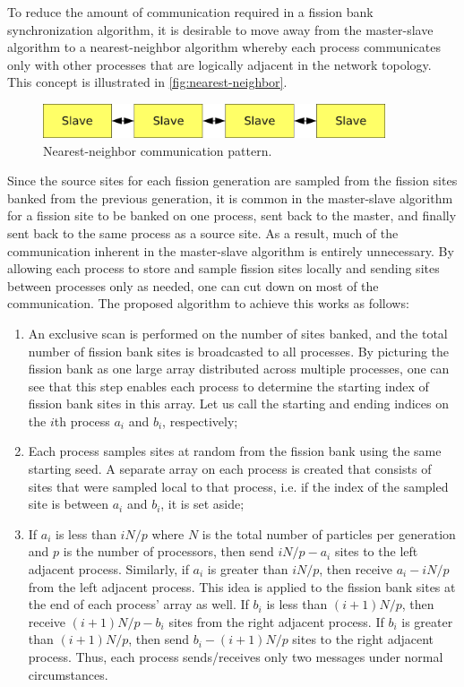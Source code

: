 To reduce the amount of communication required in a fission bank synchronization
algorithm, it is desirable to move away from the master-slave algorithm to a
nearest-neighbor algorithm whereby each process communicates only with other
processes that are logically adjacent in the network topology. This concept is
illustrated in \autoref{fig:nearest-neighbor}.
\begin{figure}[ht!]
  \centering
  \includegraphics[width=0.9\textwidth]{figures/ch3/master-slave/nearest-neighbor.pdf}
  \caption{Nearest-neighbor communication pattern.}
  \label{fig:nearest-neighbor}
\end{figure}

Since the source sites for each fission generation are sampled from the fission
sites banked from the previous generation, it is common in the master-slave
algorithm for a fission site to be banked on one process, sent back to the
master, and finally sent back to the same process as a source site. As a result,
much of the communication inherent in the master-slave algorithm is entirely
unnecessary. By allowing each process to store and sample fission sites locally
and sending sites between processes only as needed, one can cut down on most of
the communication. The proposed algorithm to achieve this works as follows:
\begin{enumerate}
\item An exclusive scan is performed on the number of sites banked, and the
  total number of fission bank sites is broadcasted to all processes. By
  picturing the fission bank as one large array distributed across multiple
  processes, one can see that this step enables each process to determine the
  starting index of fission bank sites in this array. Let us call the starting
  and ending indices on the $i$th process $a_i$ and $b_i$, respectively;
\item Each process samples sites at random from the fission bank using the same
  starting seed. A separate array on each process is created that consists of
  sites that were sampled local to that process, i.e. if the index of the
  sampled site is between $a_i$ and $b_i$, it is set aside;
\item If $a_i$ is less than $iN/p$ where $N$ is the total number of particles
  per generation and $p$ is the number of processors, then send $iN/p - a_i$
  sites to the left adjacent process. Similarly, if $a_i$ is greater than
  $iN/p$, then receive $a_i - iN/p$ from the left adjacent process. This idea is
  applied to the fission bank sites at the end of each process' array as
  well. If $b_i$ is less than $(i+1)N/p$, then receive $(i+1)N/p - b_i$ sites
  from the right adjacent process. If $b_i$ is greater than $(i+1)N/p$, then
  send $b_i - (i+1)N/p$ sites to the right adjacent process. Thus, each process
  sends/receives only two messages under normal circumstances.
\end{enumerate}

